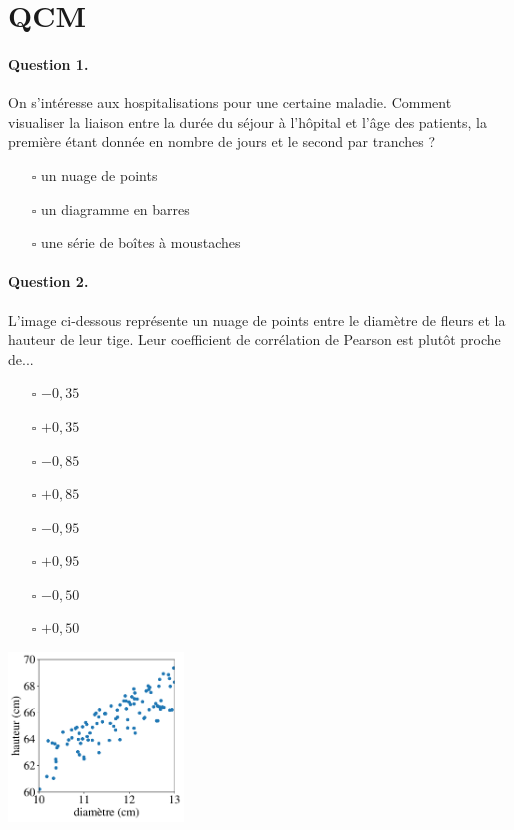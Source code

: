 \section{QCM}
\paragraph{Question 1.} On s'intéresse aux hospitalisations pour une certaine
maladie. Comment visualiser la liaison entre la durée du séjour à l'hôpital et
l'âge des patients, la première étant donnée en nombre de jours et le second
par tranches ?
\begin{itemize}
\item[$\square$] un nuage de points 
\item[$\square$] un diagramme en barres
\item[$\square$] une série de boîtes à moustaches
\end{itemize}

\paragraph{Question 2.} L'image ci-dessous représente un nuage de points entre
le diamètre de fleurs et la hauteur de leur tige. Leur coefficient de
corrélation de Pearson est plutôt proche de...
\begin{itemize}
\item[$\square$] $- 0,35$
\item[$\square$] $+ 0,35$
\item[$\square$] $- 0,85$
\item[$\square$] $+ 0,85$
\item[$\square$] $- 0,95$
\item[$\square$] $+ 0,95$
\item[$\square$] $- 0,50$
\item[$\square$] $+ 0,50$
\end{itemize}

\vspace{-13em}
\begin{center}
  \includegraphics[width=0.35\textwidth]{figures/pearson_example}
\end{center}



